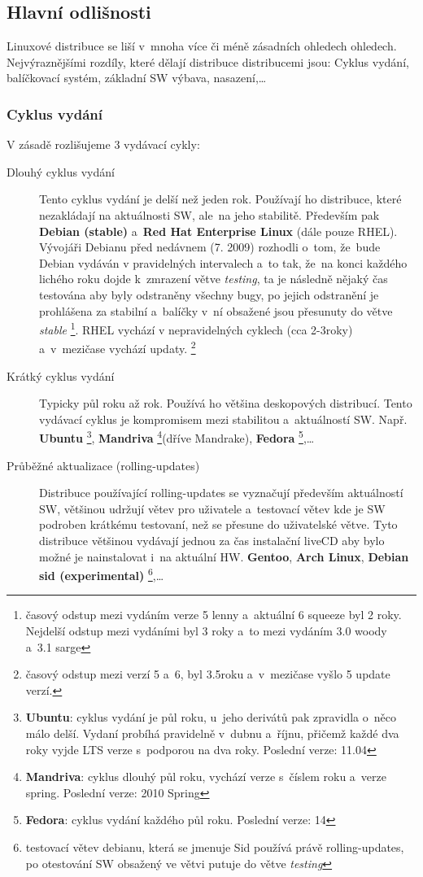 \documentclass[a4paper,12pt]{article}
\renewcommand{\b}[1]{\textbf{#1}} %
\renewcommand{\it}[1]{\textit{#1}}		%
\begin{document}
\subsection{Hlavní odlišnosti}
Linuxové distribuce se liší v~mnoha více či méně zásadních ohledech ohledech. Nejvýraznějšími rozdíly, které dělají distribuce distribucemi jsou: Cyklus vydání, balíčkovací systém, základní SW výbava, nasazení,…
\subsubsection{Cyklus vydání}
V zásadě rozlišujeme 3 vydávací cykly:
\begin{description}
 \item[Dlouhý cyklus vydání] Tento cyklus vydání je delší než jeden rok. Používají ho distribuce, které nezakládají na aktuálnosti SW, ale~na jeho stabilitě. Především pak \b{Debian (stable)} a~\b{Red Hat Enterprise Linux} (dále pouze RHEL). Vývojáři Debianu před nedávnem (7. 2009) rozhodli o~tom, že~bude Debian vydáván v pravidelných intervalech a~to tak, že~na konci každého lichého roku dojde k~zmrazení větve \it{testing}, ta je následně nějaký čas testována aby byly odstraněny všechny bugy, po jejich odstranění je prohlášena za stabilní a~balíčky v~ní obsažené jsou přesunuty do větve \it{stable}
\footnote{časový odstup mezi vydáním verze 5 lenny a~aktuální 6 squeeze byl 2 roky. Nejdelší odstup mezi vydáními byl 3 roky a~to mezi vydáním 3.0 woody a~3.1 sarge}. RHEL vychází v nepravidelných cyklech (cca 2-3roky) a~v~mezičase vychází updaty. 
\footnote{časový odstup mezi verzí 5 a~6, byl 3.5roku a~v~mezičase vyšlo 5 update verzí.}
 \item[Krátký cyklus vydání] Typicky půl roku až rok. Používá ho většina deskopových distribucí. Tento vydávací cyklus je kompromisem mezi stabilitou a~aktuálností SW. Např. \b{Ubuntu}
\footnote{\b{Ubuntu}: cyklus vydání je půl roku, u~jeho derivátů pak zpravidla o~něco málo delší. Vydaní probíhá pravidelně v~dubnu a~říjnu, přičemž každé dva roky vyjde LTS verze s~podporou na dva roky. Poslední verze: 11.04}, \b{Mandriva} 
\footnote{\b{Mandriva}: cyklus dlouhý půl roku, vychází verze s~číslem roku a~verze spring. Poslední verze: 2010 Spring}(dříve Mandrake), \b{Fedora} 
\footnote{\b{Fedora}: cyklus vydání každého půl roku. Poslední verze: 14},…
 \item[Průběžné aktualizace (rolling-updates)] Distribuce používající rolling-updates se vyznačují především aktuálností SW, většinou udržují větev pro uživatele a~testovací větev kde je SW podroben krátkému testovaní, než se přesune do uživatelské větve. Tyto distribuce většinou vydávají jednou za čas instalační liveCD aby bylo možné je nainstalovat i~na aktuální HW. \b{Gentoo}, \b{Arch Linux}, \b{Debian sid (experimental)}
\footnote{testovací větev debianu, která se jmenuje Sid používá právě rolling-updates, po otestování SW obsažený ve větvi putuje do větve \it{testing}},…
 \end{description}
\end{document}
